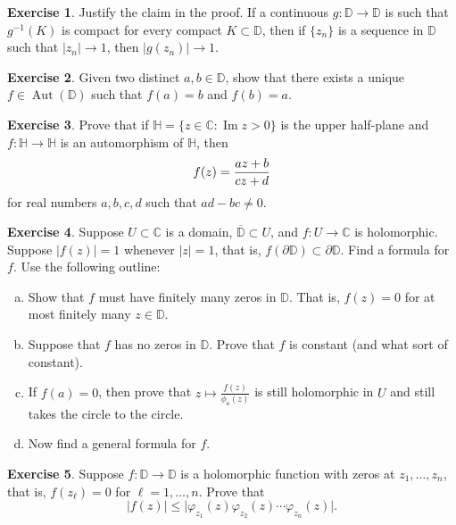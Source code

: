\documentclass[12pt,openany]{book}
\newcommand{\avoidbreak}{\postdisplaypenalty=100}
\renewcommand{\Im}{\operatorname{Im}}
\newcommand{\Aut}{\operatorname{Aut}}
\newcommand{\sabs}[1]{\lvert {#1} \rvert}
\newcommand{\C}{{\mathbb{C}}}
\newcommand{\D}{{\mathbb{D}}}
\newcommand{\bH}{{\mathbb{H}}}
\theoremstyle{plain}
\theoremstyle{remark}
\theoremstyle{definition}
\newenvironment{exbox}{%
    \def\FrameCommand{\vrule width 1pt \relax\hspace{10pt}}%
    \MakeFramed{\advance\hsize-\width\FrameRestore}%
}{%
    \endMakeFramed
}
\newenvironment{exparts}{%
    \leavevmode\begin{enumerate}[a),noitemsep,topsep=0pt,parsep=0pt,partopsep=0pt]
}{%
    \end{enumerate}
}
\theoremstyle{exercise}
\newtheorem{exercise}{Exercise}[section]
\theoremstyle{example}
\begin{document}
\begin{exbox}
\begin{exercise}
Justify the claim in the proof.  If a continuous
$g \colon \D \to \D$ is such that $g^{-1}(K)$ is compact
for every compact $K \subset \D$, then if $\{ z_n \}$ is a sequence
in $\D$ such that $\sabs{z_n} \to 1$, then
$\sabs{g(z_n)} \to 1$.
\end{exercise}

\begin{exercise}
Given two distinct $a,b \in \D$, show that there exists a unique 
$f \in \Aut(\D)$
such that $f(a) = b$ and $f(b) = a$.
\end{exercise}

\begin{exercise}
Prove that if $\bH = \{ z \in \C : \Im z > 0 \}$ is the upper half-plane
and $f \colon \bH \to \bH$ is an automorphism of $\bH$, then
\begin{equation*}
f(z) = \frac{a z +b}{c z + d}
\avoidbreak
\end{equation*}
for real numbers $a,b,c,d$ such that $ad-bc \not= 0$.
\end{exercise}

\begin{exercise}
Suppose $U \subset \C$ is a domain, $\overline{\D} \subset U$,
and $f \colon U \to \C$ is holomorphic.
Suppose $\sabs{f(z)}=1$ whenever $\sabs{z}=1$,
that is, $f(\partial \D) \subset \partial \D$.
Find a formula for $f$.  Use the following outline:
\begin{exparts}
\item
Show that $f$ must have finitely many zeros in $\D$.  That is, $f(z) = 0$
for at most finitely many $z \in \D$.
\item
Suppose that $f$ has no zeros in $\D$.  Prove that $f$ is constant
(and what sort of constant).
\item
If $f(a) = 0$, then prove that
$z \mapsto \frac{f(z)}{\phi_a(z)}$ is still holomorphic in $U$ and
still takes the circle to the circle.
\item
Now find a general formula for $f$.
\end{exparts}
\end{exercise}

\begin{exercise}
Suppose $f \colon \D \to \D$ is a holomorphic function with zeros at
$z_1,\ldots,z_n$, that is, $f(z_\ell) = 0$ for $\ell=1,\ldots,n$.  Prove that
\begin{equation*}
\sabs{f(z)} \leq \sabs{\varphi_{z_1}(z)  
\varphi_{z_2}(z)
\cdots
\varphi_{z_n}(z)} .
\end{equation*}
\end{exercise}


\end{exbox}
\end{document}
